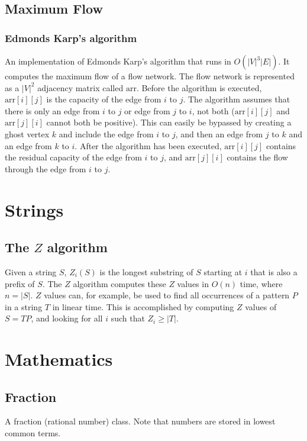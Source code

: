 \documentclass[11pt,a4paper,titlepage]{article}
\begin{document}
		\subsection{Maximum Flow}
			\subsubsection{Edmonds Karp's algorithm}
				An implementation of Edmonds Karp's algorithm that runs in $O(|V|^3|E|)$. It computes the maximum flow of a flow network. The flow network is represented as a $|V|^2$ adjacency matrix called $\mathrm{arr}$. Before the algorithm is executed, $\mathrm{arr}[i][j]$ is the capacity of the edge from $i$ to $j$. The algorithm assumes that there is only an edge from $i$ to $j$ or edge from $j$ to $i$, not both ($\mathrm{arr}[i][j]$ and $\mathrm{arr}[j][i]$ cannot both be positive). This can easily be bypassed by creating a ghost vertex $k$ and include the edge from $i$ to $j$, and then an edge from $j$ to $k$ and an edge from $k$ to $i$. After the algorithm has been executed, $\mathrm{arr}[i][j]$ contains the residual capacity of the edge from $i$ to $j$, and $\mathrm{arr}[j][i]$ contains the flow through the edge from $i$ to $j$.
				

	\section{Strings}
		\subsection{The $Z$ algorithm}
			Given a string $S$, $Z_i(S)$ is the longest substring of $S$ starting at $i$ that is also a prefix of $S$. The $Z$ algorithm computes these $Z$ values in $O(n)$ time, where $n = |S|$. $Z$ values can, for example, be used to find all occurrences of a pattern $P$ in a string $T$ in linear time. This is accomplished by computing $Z$ values of $S = T P$, and looking for all $i$ such that $Z_i \geq |T|$.

			

	\section{Mathematics}

		\subsection{Fraction}
			A fraction (rational number) class. Note that numbers are stored in lowest common terms.
			
\end{document}
